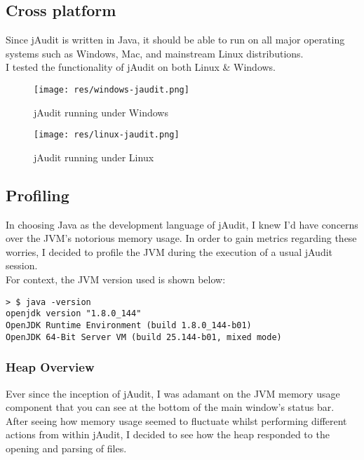 \documentclass[9pt]{article}
\begin{document}
	\subsection{Cross platform}
		Since jAudit is written in Java, it should be able to run on all major
		operating systems such as Windows, Mac, and mainstream Linux
		distributions.\\

		I tested the functionality of jAudit on both Linux \& Windows.\\

		\begin{figure}[H]
			\centering
			\texttt{[image: res/windows-jaudit.png]}
			\caption{jAudit running under Windows}
		\end{figure}

		\begin{figure}[H]
			\centering
			\texttt{[image: res/linux-jaudit.png]}
			\caption{jAudit running under Linux}
		\end{figure}

	\subsection{Profiling}

		In choosing Java as the development language of jAudit, I knew I'd
		have concerns over the JVM's notorious memory usage. In order to
		gain metrics regarding these worries, I decided to profile the JVM
		during the execution of a usual jAudit session.\\

		For context, the JVM version used is shown below:

\begin{lstlisting}
> $ java -version
openjdk version "1.8.0_144"
OpenJDK Runtime Environment (build 1.8.0_144-b01)
OpenJDK 64-Bit Server VM (build 25.144-b01, mixed mode)
\end{lstlisting}

		\subsubsection{Heap Overview}

			Ever since the inception of jAudit, I was adamant on the JVM memory
			usage component that you can see at the bottom of the main window's
			status bar. After seeing how memory usage seemed to fluctuate whilst
			performing different actions from within jAudit, I decided to see
			how the heap responded to the opening and parsing of files.\\
\end{document}
